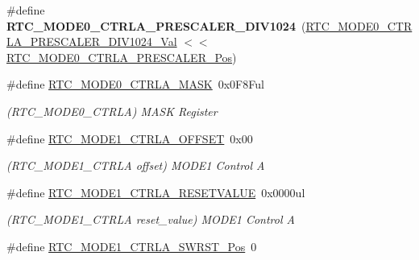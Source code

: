 \begin{DoxyCompactItemize}
\item 
\hypertarget{group___s_a_m_l21___r_t_c_ga3b5e72640565c392b14551b4b5d23270}{}\#define {\bfseries R\+T\+C\+\_\+\+M\+O\+D\+E0\+\_\+\+C\+T\+R\+L\+A\+\_\+\+P\+R\+E\+S\+C\+A\+L\+E\+R\+\_\+\+D\+I\+V1024}~(\hyperlink{group___s_a_m_l21___r_t_c_ga831f9eaa76aec5a525d35687ba24bb89}{R\+T\+C\+\_\+\+M\+O\+D\+E0\+\_\+\+C\+T\+R\+L\+A\+\_\+\+P\+R\+E\+S\+C\+A\+L\+E\+R\+\_\+\+D\+I\+V1024\+\_\+\+Val} $<$$<$ \hyperlink{group___s_a_m_l21___r_t_c_ga0dbb76324e6c9c6d9391c96723e6e59b}{R\+T\+C\+\_\+\+M\+O\+D\+E0\+\_\+\+C\+T\+R\+L\+A\+\_\+\+P\+R\+E\+S\+C\+A\+L\+E\+R\+\_\+\+Pos})\label{group___s_a_m_l21___r_t_c_ga3b5e72640565c392b14551b4b5d23270}

\item 
\hypertarget{group___s_a_m_l21___r_t_c_ga8902a0c29025ef8040e0703d17267571}{}\#define \hyperlink{group___s_a_m_l21___r_t_c_ga8902a0c29025ef8040e0703d17267571}{R\+T\+C\+\_\+\+M\+O\+D\+E0\+\_\+\+C\+T\+R\+L\+A\+\_\+\+M\+A\+S\+K}~0x0\+F8\+Ful\label{group___s_a_m_l21___r_t_c_ga8902a0c29025ef8040e0703d17267571}

\begin{DoxyCompactList}\small\item\em (R\+T\+C\+\_\+\+M\+O\+D\+E0\+\_\+\+C\+T\+R\+L\+A) M\+A\+S\+K Register \end{DoxyCompactList}\item 
\hypertarget{group___s_a_m_l21___r_t_c_ga7b732d6aa496ea1347167ee5342576c8}{}\#define \hyperlink{group___s_a_m_l21___r_t_c_ga7b732d6aa496ea1347167ee5342576c8}{R\+T\+C\+\_\+\+M\+O\+D\+E1\+\_\+\+C\+T\+R\+L\+A\+\_\+\+O\+F\+F\+S\+E\+T}~0x00\label{group___s_a_m_l21___r_t_c_ga7b732d6aa496ea1347167ee5342576c8}

\begin{DoxyCompactList}\small\item\em (R\+T\+C\+\_\+\+M\+O\+D\+E1\+\_\+\+C\+T\+R\+L\+A offset) M\+O\+D\+E1 Control A \end{DoxyCompactList}\item 
\hypertarget{group___s_a_m_l21___r_t_c_ga72bb6858fe007931ecab488d78dacf86}{}\#define \hyperlink{group___s_a_m_l21___r_t_c_ga72bb6858fe007931ecab488d78dacf86}{R\+T\+C\+\_\+\+M\+O\+D\+E1\+\_\+\+C\+T\+R\+L\+A\+\_\+\+R\+E\+S\+E\+T\+V\+A\+L\+U\+E}~0x0000ul\label{group___s_a_m_l21___r_t_c_ga72bb6858fe007931ecab488d78dacf86}

\begin{DoxyCompactList}\small\item\em (R\+T\+C\+\_\+\+M\+O\+D\+E1\+\_\+\+C\+T\+R\+L\+A reset\+\_\+value) M\+O\+D\+E1 Control A \end{DoxyCompactList}\item 
\hypertarget{group___s_a_m_l21___r_t_c_gab00b5e2f751659fd6f6c62231b436f8a}{}\#define \hyperlink{group___s_a_m_l21___r_t_c_gab00b5e2f751659fd6f6c62231b436f8a}{R\+T\+C\+\_\+\+M\+O\+D\+E1\+\_\+\+C\+T\+R\+L\+A\+\_\+\+S\+W\+R\+S\+T\+\_\+\+Pos}~0\label{group___s_a_m_l21___r_t_c_gab00b5e2f751659fd6f6c62231b436f8a}


\end{DoxyCompactItemize}

